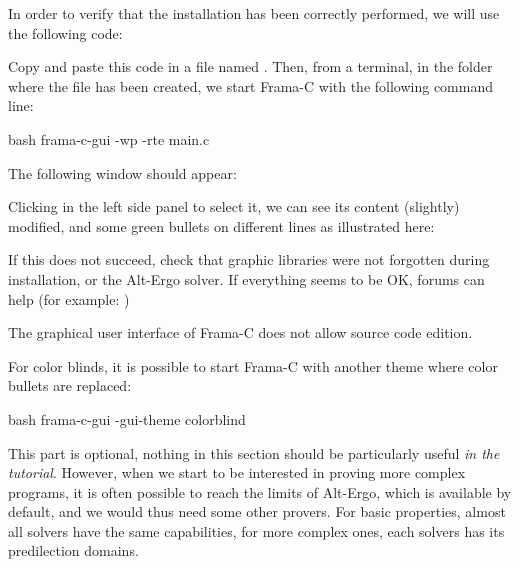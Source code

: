 

In order to verify that the installation has been correctly performed,
we will use the following code:





Copy and paste this code in a file named .
Then, from a terminal, in the folder where the file has been created, we
start Frama-C with the following command line:



\begin{CodeBlock}{bash}
frama-c-gui -wp -rte main.c
\end{CodeBlock}



The following window should appear:





Clicking  in the left side panel to select it, we can see
its content (slightly) modified, and some green bullets on different
lines as illustrated here:





If this does not succeed, check that graphic libraries were not forgotten
during installation, or the Alt-Ergo solver. If everything seems to be OK,
forums can help (for example: )



\begin{Warning}
  The graphical user interface of Frama-C does not allow source code edition.
\end{Warning}


\begin{Information}
  For color blinds, it is possible to start Frama-C with another theme where
  color bullets are replaced:

\begin{CodeBlock}{bash}
frama-c-gui -gui-theme colorblind
\end{CodeBlock}
\end{Information}




This part is optional, nothing in this section should be particularly
useful \emph{in the tutorial}. However, when we start to be interested
in proving more complex programs, it is often possible to reach the
limits of Alt-Ergo, which is available by default, and we would thus need
some other provers. For basic properties, almost all solvers have the
same capabilities, for more complex ones, each solvers has its predilection
domains.


